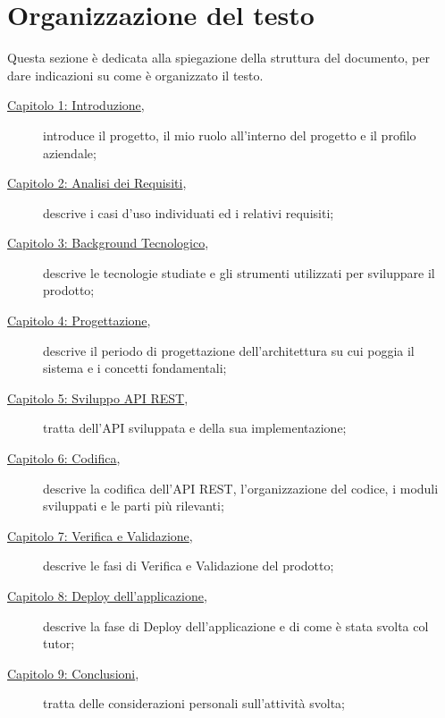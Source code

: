 \section{Organizzazione del testo}
Questa sezione è dedicata alla spiegazione della struttura del documento, per dare indicazioni su come è organizzato il testo.
\begin{description}

\item [{\hyperref[cap:introduzione]{Capitolo 1: Introduzione}},] introduce il progetto, il mio ruolo all'interno del progetto e il profilo aziendale;

    \item [{\hyperref[cap:analisi-requisiti]{Capitolo 2: Analisi dei Requisiti}},] descrive i casi d'uso individuati ed i relativi requisiti;
    
    \item[{\hyperref[cap:tecnologie]{Capitolo 3: Background Tecnologico}},] descrive le tecnologie studiate e gli strumenti utilizzati per sviluppare il prodotto;
    
    \item[{\hyperref[cap:progettazione]{Capitolo 4: Progettazione}},] descrive il periodo di progettazione dell'architettura su cui poggia il sistema e i concetti fondamentali;
    
    \item[{\hyperref[cap:api-rest]{Capitolo 5: Sviluppo API REST}},] tratta dell'API sviluppata e della sua implementazione;
    
    \item[{\hyperref[cap:codifica]{Capitolo 6: Codifica}},] descrive la codifica dell'API REST, l'organizzazione del codice, i moduli sviluppati e le parti più rilevanti;
    
    \item[{\hyperref[cap:verifica-validazione]{Capitolo 7: Verifica e Validazione}},] descrive le fasi di Verifica e Validazione del prodotto;
    
    \item[{\hyperref[cap:deploy]{Capitolo 8: Deploy dell'applicazione}},] descrive la fase di Deploy dell'applicazione e di come è stata svolta col tutor;
    
    \item[{\hyperref[cap:conclusioni]{Capitolo 9: Conclusioni}},] tratta delle considerazioni personali sull'attività svolta;
    
\end{description}

